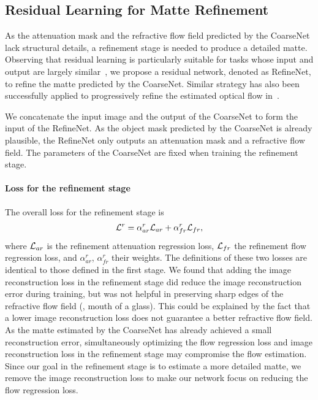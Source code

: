 \subsection{Residual Learning for Matte Refinement}
\label{par:Residual Learning for Matte Refinement}
As the attenuation mask and the refractive flow field predicted by the CoarseNet lack structural details, a refinement stage is needed to produce a detailed matte. Observing that residual learning is particularly suitable for tasks whose input and output are largely similar~\cite{kim2016accurate,Nah_2017_CVPR}, we propose a residual network, denoted as RefineNet, to refine the matte predicted by the CoarseNet. 
Similar strategy has also been successfully applied to progressively refine the estimated optical flow in~\cite{ilg2017flownet}.

We concatenate the input image and the output of the CoarseNet to form the input of the RefineNet. As the object mask predicted by the CoarseNet is already plausible, the RefineNet only outputs an attenuation mask and a refractive flow field. The parameters of the CoarseNet are fixed when training the refinement stage. 

\paragraph{Loss for the refinement stage}
\label{par:Loss for Refinement}
The overall loss for the refinement stage is
\begin{align}
    \mathcal{L}^r = \alpha^r_{ar} \mathcal{L}_{ar} + \alpha^r_{fr} \mathcal{L}_{fr} ,
\end{align}
where $\mathcal{L}_{ar}$ is the refinement attenuation regression loss, $\mathcal{L}_{fr}$ the refinement flow regression loss,  and $\alpha^r_{ar}$, $\alpha^r_{fr}$ their weights. The definitions of these two losses are identical to those defined in the first stage. 
We found that adding the image reconstruction loss in the refinement stage did reduce the image reconstruction error during training, but was not helpful in preserving sharp edges of the refractive flow field (\eg, mouth of a glass). This could be explained by the fact that a lower image reconstruction loss does not guarantee a better refractive flow field. As the matte estimated by the CoarseNet has already achieved a small reconstruction error, simultaneously optimizing the flow regression loss and image reconstruction loss in the refinement stage may compromise the flow estimation.
Since our goal in the refinement stage is to estimate a more detailed matte, we remove the image reconstruction loss to make our network focus on reducing the flow regression loss.

